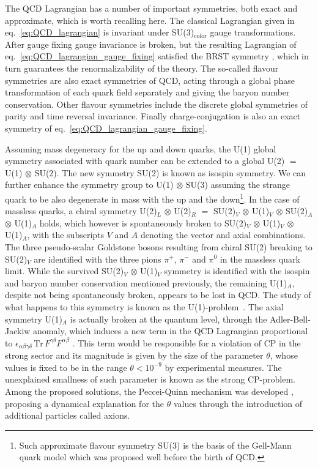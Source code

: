 The QCD Lagrangian has a number of important symmetries, both exact and approximate,
which is worth recalling here.
The classical Lagrangian given in eq.~\eqref{eq:QCD_lagrangian} is invariant under SU(3)$_{\text{color}}$
gauge transformations. After gauge fixing gauge invariance is broken, but the resulting Lagrangian of 
eq.~\eqref{eq:QCD_lagrangian_gauge_fixing} satisfied the BRST symmetry \cite{Becchi:1975nq, Tyutin:1975qk},
which in turn guarantees the renormalizability of the theory.
The so-called flavour symmetries are also exact symmetries of QCD, 
acting through a global phase transformation of each quark field separately and giving
the baryon number conservation. 
Other flavour symmetries include the discrete global symmetries of parity and time reversal invariance.
Finally charge-conjugation is also an exact symmetry of eq.~\eqref{eq:QCD_lagrangian_gauge_fixing}. 

Assuming mass degeneracy for the up and down quarks, the U(1) global symmetry associated with quark number 
can be extended to a global U(2) $=$ U(1) $\otimes$ SU(2). The new symmetry SU(2) is known as isospin symmetry.
We can further enhance the symmetry group to U(1) $\otimes$ SU(3) assuming the strange quark to be also 
degenerate in mass with the up and the down\footnote{Such approximate flavour symmetry SU(3) is the basis of the Gell-Mann
quark model \cite{GellMann:1964nj} which was proposed well before the birth of QCD.}.
In the case of massless quarks, a chiral symmetry
U(2)$_{L}$ $\otimes$ U(2)$_R$ $=$ SU(2)$_V$ $\otimes$ U(1)$_V$ $\otimes$  SU(2)$_A$ $\otimes$ U(1)$_A$ 
holds, which however is spontaneously broken to SU(2)$_V$ $\otimes$ U(1)$_V$ $\otimes$ U(1)$_A$,
with the subscripts $V$ and $A$ denoting the vector and axial combinations.
The three pseudo-scalar Goldstone bosons resulting from chiral SU(2) breaking 
to SU(2)$_V$ are identified with the three pions $\pi^+$, $\pi^-$ and $\pi^0$
in the massless quark limit. 
While the survived SU(2)$_V$ $\otimes$ U(1)$_V$ symmetry is identified with the isospin and baryon number 
conservation mentioned previously, the remaining U(1)$_A$, despite not being spontaneously broken,
appears to be lost in QCD. The study of what happens to this symmetry is known as the U(1)-problem~\cite{Weinberg:1975ui}.
The axial symmetry U(1)$_A$ is actually broken at the quantum level, through the Adler-Bell-Jackiw anomaly,
which induces a new term in the QCD Lagrangian proportional to 
$\epsilon_{\alpha\beta\gamma\delta}\, \text{Tr}\, F^{\gamma\delta} F^{\alpha\beta}$ .
This term would be responsible for a violation of CP in the strong sector and 
its magnitude is given by the size of the parameter $\theta$, whose values is fixed to be in the range
$\theta<10^{-9}$ by experimental measures. The unexplained smallness of such parameter is known as the strong CP-problem.
Among the proposed solutions, the Peccei-Quinn mechanism was developed \cite{Peccei:1977ur}, proposing a dynamical explanation
for the $\theta$ values through the introduction of additional particles called axions. 

